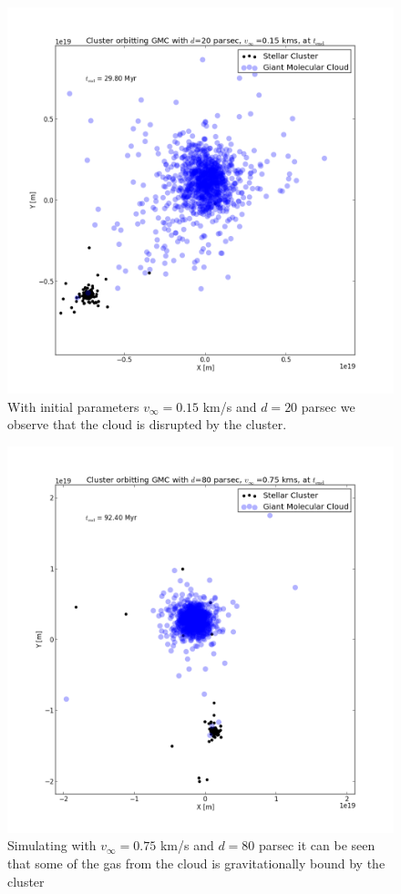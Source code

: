 \documentclass{aa}
\begin{document}
\begin{figure}[h!]
    \centering
    \includegraphics[width=\hsize]{img/v_15_d_20.png}
    \caption{With initial parameters $v_\infty = 0.15$ km/s and $d = 20$ parsec we observe that the cloud is disrupted by the cluster.}\label{fig:v_15_d_20}
\end{figure}
\begin{figure}[h!]
    \centering
    \includegraphics[width=\hsize]{img/v_75_d_80.png}
    \caption{Simulating with $v_\infty = 0.75$ km/s and $d = 80$ parsec it can be seen that some of the gas from the cloud is gravitationally bound by the cluster}\label{fig:v_75_d_80}
\end{figure}
\end{document}
